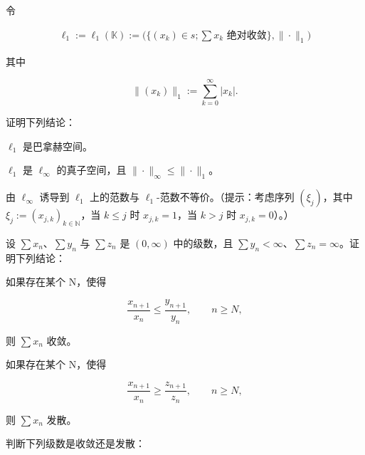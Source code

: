 \begin{exercises}
令

\begin{equation*}
\begin{array}{r}{\ell_{1}:=\ell_{1}(\mathbb{K}):=\Big(\big\{(x_{k})\in s;\sum x_{k}\text{ 绝对收敛}\big\},\|\cdot\|_{1}\Big)}\end{array}
\end{equation*}

其中

\[
\|(x_{k})\|_{1}:=\sum_{k=0}^{\infty}|x_{k}|.
\]

证明下列结论：

\begin{items}
\item

$ \ell_{1} $ 是巴拿赫空间。

\item

$ \ell_1 $ 是 $ \ell_\infty $ 的真子空间，且 $ \|\cdot\|_\infty \leq \|\cdot\|_1 $。

\item

由 $\ell_\infty$ 诱导到 $\ell_1$ 上的范数与 $\ell_1$-范数不等价。（提示：考虑序列 $(\xi_j)$，其中 $\xi_j := (x_{j,k})_{k \in \mathbb{N}}$，当 $k \leq j$ 时 $x_{j,k} = 1$，当 $k > j$ 时 $x_{j,k} = 0$）。）

\end{items}

\item

设 $\sum x_n$、$\sum y_n$ 与 $\sum z_n$ 是 $(0, \infty)$ 中的级数，且 $\sum y_n < \infty$、$\sum z_n = \infty$。证明下列结论：

\begin{items}
\item

如果存在某个 N，使得

\[
\frac{x_{n+1}}{x_{n}}\leq\frac{y_{n+1}}{y_{n}},\qquad n\geq N,
\]

则 $ \sum x_n $ 收敛。

\item

如果存在某个 N，使得

\[
\frac{x_{n+1}}{x_{n}}\geq\frac{z_{n+1}}{z_{n}},\qquad n\geq N,
\]

则 $ \sum x_{n} $ 发散。

\end{items}

\item

判断下列级数是收敛还是发散：


\end{exercises}
